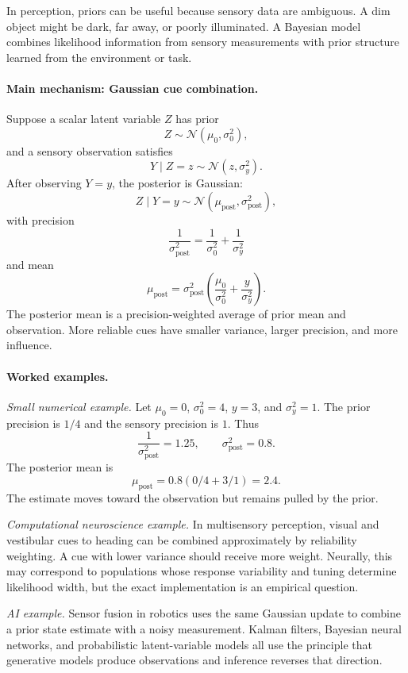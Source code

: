 In perception, priors can be useful because sensory data are ambiguous. A dim object might be dark, far away, or poorly illuminated. A Bayesian model combines likelihood information from sensory measurements with prior structure learned from the environment or task.

\paragraph{Main mechanism: Gaussian cue combination.}
Suppose a scalar latent variable \(Z\) has prior
\[
Z\sim\mathcal N(\mu_0,\sigma_0^2),
\]
and a sensory observation satisfies
\[
Y\mid Z=z\sim\mathcal N(z,\sigma_y^2).
\]
After observing \(Y=y\), the posterior is Gaussian:
\[
Z\mid Y=y\sim\mathcal N(\mu_{\mathrm{post}},\sigma_{\mathrm{post}}^2),
\]
with precision
\[
\boxed{
\frac{1}{\sigma_{\mathrm{post}}^2}
=\frac{1}{\sigma_0^2}+\frac{1}{\sigma_y^2}
}
\]
and mean
\[
\boxed{
\mu_{\mathrm{post}}
=\sigma_{\mathrm{post}}^2
\left(
\frac{\mu_0}{\sigma_0^2}
+
\frac{y}{\sigma_y^2}
\right).
}
\]
The posterior mean is a precision-weighted average of prior mean and observation. More reliable cues have smaller variance, larger precision, and more influence.

\paragraph{Worked examples.}
\emph{Small numerical example.}
Let \(\mu_0=0\), \(\sigma_0^2=4\), \(y=3\), and \(\sigma_y^2=1\). The prior precision is \(1/4\) and the sensory precision is \(1\). Thus
\[
\frac{1}{\sigma_{\mathrm{post}}^2}=1.25,
\qquad
\sigma_{\mathrm{post}}^2=0.8.
\]
The posterior mean is
\[
\mu_{\mathrm{post}}=0.8\left(0/4+3/1\right)=2.4.
\]
The estimate moves toward the observation but remains pulled by the prior.

\emph{Computational neuroscience example.}
In multisensory perception, visual and vestibular cues to heading can be combined approximately by reliability weighting. A cue with lower variance should receive more weight. Neurally, this may correspond to populations whose response variability and tuning determine likelihood width, but the exact implementation is an empirical question.

\emph{AI example.}
Sensor fusion in robotics uses the same Gaussian update to combine a prior state estimate with a noisy measurement. Kalman filters, Bayesian neural networks, and probabilistic latent-variable models all use the principle that generative models produce observations and inference reverses that direction.


